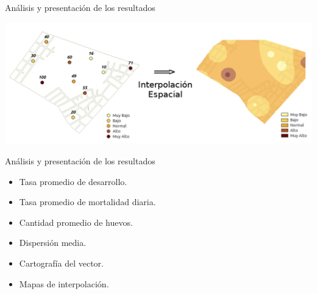 \begin{frame}[c]{Análisis y presentación de los resultados}
  \begin{center}
      \includegraphics[width=\textwidth]{./graphics/identificacion-focos.png}
  \end{center}
\end{frame}

\begin{frame}[t]{Análisis y presentación de los resultados}
  \begin{center}
      \begin{itemize}
        \item Tasa promedio de desarrollo.
        \item Tasa promedio de mortalidad diaria.
        \item Cantidad promedio de huevos.
        \item Dispersión media.
        \item Cartografía del vector.
        \item Mapas de interpolación.
      \end{itemize}
  \end{center}
\end{frame}
